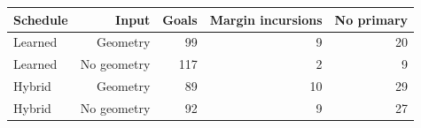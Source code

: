 \begin{tabular}{lrrrr}
\toprule
Schedule & Input & Goals & Margin incursions & No primary \\
\midrule
Learned & Geometry & 99 & 9 & 20 \\
Learned & No geometry & 117 & 2 & 9 \\
Hybrid & Geometry & 89 & 10 & 29 \\
Hybrid & No geometry & 92 & 9 & 27 \\
\bottomrule
\end{tabular}
